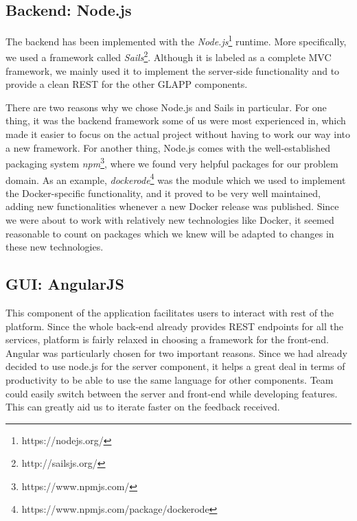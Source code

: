 \documentclass{seal_thesis}
\begin{document}
\subsection{Backend: Node.js}
The backend has been implemented with the \textit{Node.js}\footnote{https://nodejs.org/} runtime.
More specifically, we used a framework called \textit{Sails}\footnote{http://sailsjs.org/}.
Although it is labeled as a complete MVC framework, we mainly used it to implement the server-side functionality and to provide a clean REST for the other GLAPP components.

There are two reasons why we chose Node.js and Sails in particular.
For one thing, it was the backend framework some of us were most experienced in, which made it easier to focus on the actual project without having to work our way into a new framework.
For another thing, Node.js comes with the well-established packaging system \textit{npm}\footnote{https://www.npmjs.com/}, where we found very helpful packages for our problem domain.
As an example, \textit{dockerode}\footnote{https://www.npmjs.com/package/dockerode} was the module which we used to implement the Docker-specific functionality, and it proved to be very well maintained, adding new functionalities whenever a new Docker release was published.
Since we were about to work with relatively new technologies like Docker, it seemed reasonable to count on packages which we knew will be adapted to changes in these new technologies.

\subsection{GUI: AngularJS}


This component of the application facilitates users to interact with rest of the platform. 
Since the whole back-end already provides REST endpoints for all the services, platform is fairly relaxed in choosing a framework for the front-end. 
Angular was particularly chosen for two important reasons. 
Since we had already decided to use node.js for the server component, it helps a great deal in terms of productivity to be able to use the same language for other components. 
Team could easily switch between the server and front-end while developing features. 
This can greatly aid us to iterate faster on the feedback received. 
\end{document}
